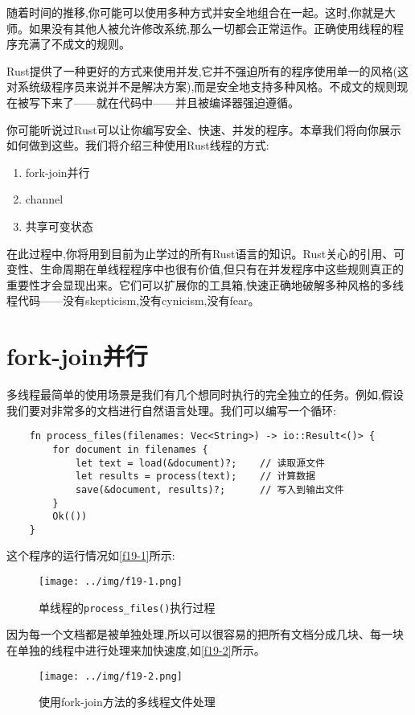 随着时间的推移,你可能可以使用多种方式并安全地组合在一起。这时,你就是大师。如果没有其他人被允许修改系统,那么一切都会正常运作。正确使用线程的程序充满了不成文的规则。

Rust提供了一种更好的方式来使用并发,它并不强迫所有的程序使用单一的风格(这对系统级程序员来说并不是解决方案),而是安全地支持多种风格。不成文的规则现在被写下来了——就在代码中——并且被编译器强迫遵循。

你可能听说过Rust可以让你编写安全、快速、并发的程序。本章我们将向你展示如何做到这些。我们将介绍三种使用Rust线程的方式:
\begin{enumerate}
    \item fork-join并行
    \item channel
    \item 共享可变状态
\end{enumerate}

在此过程中,你将用到目前为止学过的所有Rust语言的知识。Rust关心的引用、可变性、生命周期在单线程程序中也很有价值,但只有在并发程序中这些规则真正的重要性才会显现出来。它们可以扩展你的工具箱,快速正确地破解多种风格的多线程代码——没有skepticism,没有cynicism,没有fear。

\section{fork-join并行}
多线程最简单的使用场景是我们有几个想同时执行的完全独立的任务。例如,假设我们要对非常多的文档进行自然语言处理。我们可以编写一个循环:
\begin{verbatim}
    fn process_files(filenames: Vec<String>) -> io::Result<()> {
        for document in filenames {
            let text = load(&document)?;    // 读取源文件
            let results = process(text);    // 计算数据
            save(&document, results)?;      // 写入到输出文件
        }
        Ok(())
    }
\end{verbatim}

这个程序的运行情况如\autoref{f19-1}所示:

\begin{figure}[htbp]
    \centering
    \texttt{[image: ../img/f19-1.png]}
    \caption{单线程的\texttt{process\_files()}执行过程}
    \label{f19-1}
\end{figure}

因为每一个文档都是被单独处理,所以可以很容易的把所有文档分成几块、每一块在单独的线程中进行处理来加快速度,如\autoref{f19-2}所示。

\begin{figure}[htbp]
    \centering
    \texttt{[image: ../img/f19-2.png]}
    \caption{使用fork-join方法的多线程文件处理}
    \label{f19-2}
\end{figure}

